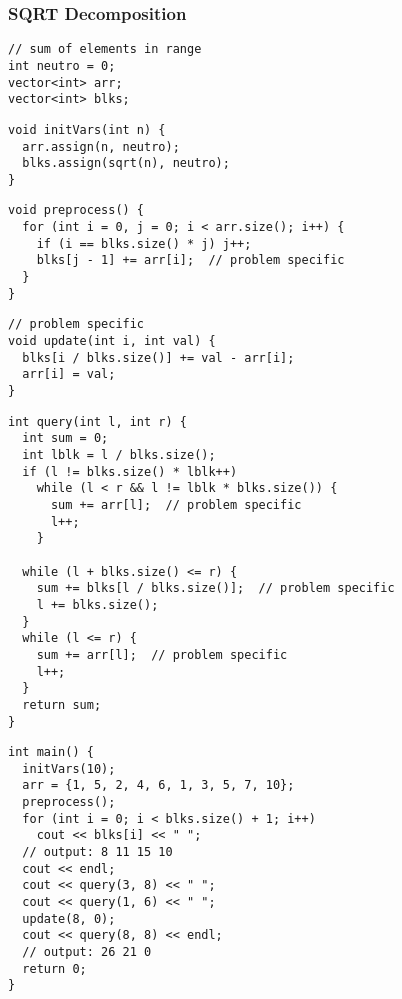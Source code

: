 \documentclass[twoside]{article}
\newcommand{\fileTitleStyle}{\large\underline}
\begin{document}
\begin{multicols*}{2}
\subsubsectionfont{\centering\bfseries\Large}
\subsubsectionfont{\fileTitleStyle}
\subsubsection*{SQRT Decomposition}
\begin{verbatim}
// sum of elements in range
int neutro = 0;
vector<int> arr;
vector<int> blks;
\end{verbatim}
\vspace{-12pt}
\begin{verbatim}
void initVars(int n) {
  arr.assign(n, neutro);
  blks.assign(sqrt(n), neutro);
}
\end{verbatim}
\vspace{-12pt}
\begin{verbatim}
void preprocess() {
  for (int i = 0, j = 0; i < arr.size(); i++) {
    if (i == blks.size() * j) j++;
    blks[j - 1] += arr[i];  // problem specific
  }
}
\end{verbatim}
\vspace{-12pt}
\begin{verbatim}
// problem specific
void update(int i, int val) {
  blks[i / blks.size()] += val - arr[i];
  arr[i] = val;
}
\end{verbatim}
\vspace{-12pt}
\begin{verbatim}
int query(int l, int r) {
  int sum = 0;
  int lblk = l / blks.size();
  if (l != blks.size() * lblk++)
    while (l < r && l != lblk * blks.size()) {
      sum += arr[l];  // problem specific
      l++;
    }

  while (l + blks.size() <= r) {
    sum += blks[l / blks.size()];  // problem specific
    l += blks.size();
  }
  while (l <= r) {
    sum += arr[l];  // problem specific
    l++;
  }
  return sum;
}
\end{verbatim}
\vspace{-12pt}
\begin{verbatim}
int main() {
  initVars(10);
  arr = {1, 5, 2, 4, 6, 1, 3, 5, 7, 10};
  preprocess();
  for (int i = 0; i < blks.size() + 1; i++)
    cout << blks[i] << " ";
  // output: 8 11 15 10
  cout << endl;
  cout << query(3, 8) << " ";
  cout << query(1, 6) << " ";
  update(8, 0);
  cout << query(8, 8) << endl;
  // output: 26 21 0
  return 0;
}
\end{verbatim}


\end{multicols*}
\end{document}
